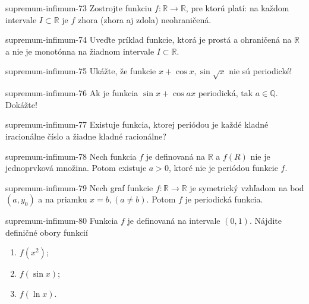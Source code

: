 \begin{defproblem}{supremum-infimum-73}
Zostrojte funkciu $f:\mathbb{R}\rightarrow\mathbb{R}$, pre ktorú platí: na každom intervale $I\subset\mathbb{R}$ je $f$ zhora (zhora aj zdola) neohraničená.
\end{defproblem}

\begin{defproblem}{supremum-infimum-74}
Uveďte príklad funkcie, ktorá je prostá a ohraničená na $\mathbb{R}$ a nie je monotónna na žiadnom intervale $I\subset\mathbb{R}$.
\end{defproblem}

\begin{defproblem}{supremum-infimum-75}
Ukážte, že funkcie $x+\cos x,\sin\sqrt{x}$ nie sú periodické!
\end{defproblem}

\begin{defproblem}{supremum-infimum-76}
Ak je funkcia $\sin x +\cos ax$ periodická, tak $a\in\mathbb{Q}$. Dokážte!
\end{defproblem}

\begin{defproblem}{supremum-infimum-77}
Existuje funkcia, ktorej periódou je každé kladné iracionálne číslo a žiadne kladné racionálne?
\end{defproblem}

\begin{defproblem}{supremum-infimum-78}
Nech funkcia $f$ je definovaná na $\mathbb{R}$ a $f(R)$ nie je jednoprvková množina. Potom existuje $a>0$, ktoré nie je periódou funkcie $f$.
\end{defproblem}

\begin{defproblem}{supremum-infimum-79}
Nech graf funkcie $f:\mathbb{R}\rightarrow\mathbb{R}$ je symetrický vzhľadom na bod $(a,y_0)$ a na priamku $x=b,(a\neq b)$. Potom $f$ je periodická funkcia.
\end{defproblem}

\begin{defproblem}{supremum-infimum-80}
Funkcia $f$ je definovaná na intervale $(0,1)$. Nájdite definičné obory funkcií
\begin{enumerate}
\item $f(x^2)$;
\item $f(\sin x)$;
\item $f(\ln x)$.
\end{enumerate}
\end{defproblem}

